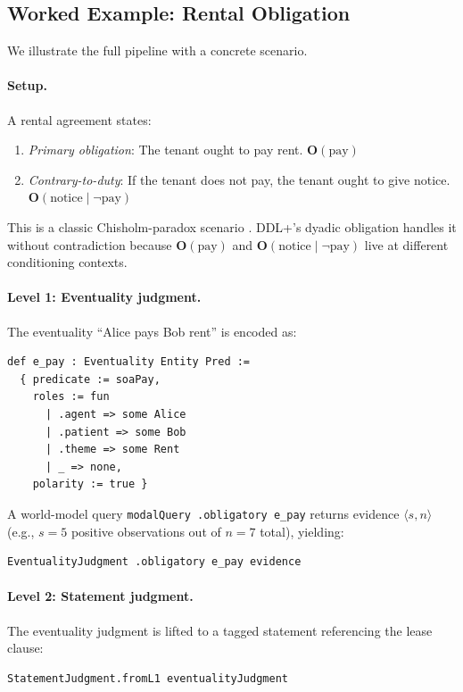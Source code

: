 \documentclass[]{article}
\newcommand{\code}[1]{\texttt{#1}}
\newcommand{\OB}{\ensuremath{\mathbf{O}}}
\newcommand{\DDL}{\textup{DDL+}}
\begin{document}
\subsection{Worked Example: Rental Obligation}
\label{sec:rental}

We illustrate the full pipeline with a concrete scenario.

\paragraph{Setup.}
A rental agreement states:
\begin{enumerate}
\item[(P)] \emph{Primary obligation}: The tenant ought to pay rent.
  \hfill $\OB(\text{pay})$
\item[(CTD)] \emph{Contrary-to-duty}: If the tenant does not pay,
  the tenant ought to give notice.
  \hfill $\OB(\text{notice} \mid \neg\text{pay})$
\end{enumerate}

\noindent
This is a classic Chisholm-paradox scenario \cite{Chisholm1963}.
\DDL{}'s dyadic obligation handles it without contradiction because
$\OB(\text{pay})$ and $\OB(\text{notice} \mid \neg\text{pay})$ live at
different conditioning contexts.

\paragraph{Level 1: Eventuality judgment.}
The eventuality ``Alice pays Bob rent'' is encoded as:
\begin{lstlisting}
def e_pay : Eventuality Entity Pred :=
  { predicate := soaPay,
    roles := fun
      | .agent => some Alice
      | .patient => some Bob
      | .theme => some Rent
      | _ => none,
    polarity := true }
\end{lstlisting}
A world-model query \code{modalQuery .obligatory e\_pay} returns evidence
$\langle s, n \rangle$ (e.g., $s=5$ positive observations out of $n=7$ total),
yielding:
\begin{lstlisting}
EventualityJudgment .obligatory e_pay evidence
\end{lstlisting}

\paragraph{Level 2: Statement judgment.}
The eventuality judgment is lifted to a tagged statement referencing
the lease clause:
\begin{lstlisting}
StatementJudgment.fromL1 eventualityJudgment
\end{lstlisting}
\end{document}
